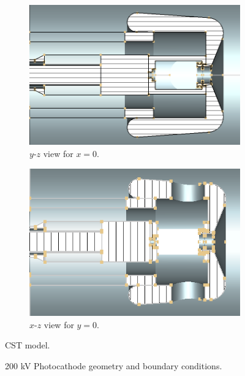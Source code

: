 \begin{center}
\begin{figure}[H]
   \begin{subfigure}{0.45\textwidth}
      \includegraphics[width=\textwidth]{figures/200kV/png/v1_cutx}
      \caption{$y$-$z$ view for $x=0$.}
      \label{fig:cst_geometry_yz}
   \end{subfigure}
   \begin{subfigure}{0.45\textwidth}
      \includegraphics[width=\textwidth]{figures/200kV/png/v1_cuty}
      \caption{$x$-$z$ view for $y=0$.}
      \label{fig:cst_geometry_xz}
   \end{subfigure}
   \caption{CST model.}
\end{figure}
\end{center}

\begin{center}
\begin{figure}[H]
  
  \caption{200 kV Photocathode geometry and boundary conditions.}
  \label{fig:200kV_geometry_v1}
\end{figure}
\end{center}

